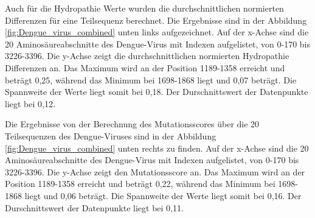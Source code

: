 \documentclass[german,version-2022-01]{uzl-thesis}
\begin{document}
Auch f\"ur die Hydropathie Werte wurden die durchschnittlichen normierten Differenzen f\"ur eine Teilsequenz berechnet. Die Ergebnisse sind in der Abbildung \ref{fig:Dengue_virus_combined} unten links aufgezeichnet. Auf der x-Achse sind die 20 Aminos\"aureabschnitte des Dengue-Virus mit Indexen aufgelistet, von 0-170 bis 3226-3396. Die y-Achse zeigt die durchschnittlichen normierten Hydropathie Differenzen an. Das Maximum wird an der Position 1189-1358 erreicht und betr\"agt 0,25, w\"ahrend das Minimum bei 1698-1868 liegt und 0,07 betr\"agt. Die Spannweite der Werte liegt somit bei 0,18. Der Durschnittswert der Datenpunkte liegt bei 0,12.

Die Ergebnisse von der Berechnung des Mutationsscores \"uber die 20 Teilsequenzen des Dengue-Viruses sind in der Abbildung \ref{fig:Dengue_virus_combined} unten rechts zu finden. Auf der x-Achse sind die 20 Aminos\"aureabschnitte des Dengue-Virus mit Indexen aufgelistet, von 0-170 bis 3226-3396. Die y-Achse zeigt den Mutationsscore an. Das Maximum wird an der Position 1189-1358 erreicht und betr\"agt 0,22, w\"ahrend das Minimum bei 1698-1868 liegt und 0,06 betr\"agt. Die Spannweite der Werte liegt somit bei 0,16. Der Durschnittswert der Datenpunkte liegt bei 0,11. 
\end{document}
